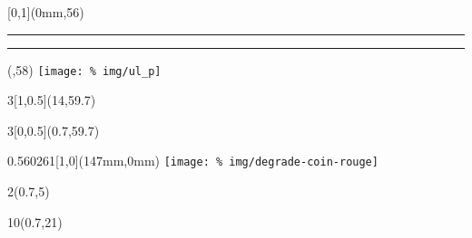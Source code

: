 \begin{frame}[plain]
  \begin{textblock*}{\paperwidth}[0,1](0mm,56\TPVertModule)
    \textcolor{rouge}{\rule{\banderougewidth}{\banderougeheight}}%
    \textcolor{or}{\rule{\bandeorwidth}{\bandeorheight}}           %
  \end{textblock*}

  \begin{textblock*}{\bandeorwidth}(\banderougewidth,58\TPVertModule)
    \texttt{[image: \%
      img/ul\_p]}
  \end{textblock*}
  \begin{textblock*}{3\TPHorizModule}[1,0.5](14\TPHorizModule,59.7\TPVertModule)
    \raggedleft\fsgiid
  \end{textblock*}
  \begin{textblock*}{3\TPHorizModule}[0,0.5](0.7\TPHorizModule,59.7\TPVertModule)
	\iidurl
\end{textblock*}

  \begin{textblock*}{0.560261\imageheight}[1,0](147mm,0mm)
    \texttt{[image: \%
	img/degrade-coin-rouge]}
  \end{textblock*}

  \begin{textblock*}{2\TPHorizModule}(0.7\TPHorizModule,5\TPVertModule)
    \textcolor[rgb]{0.37,0.37,0.37}{\webinaire}
  \end{textblock*}

  \begin{textblock*}{10\TPHorizModule}(0.7\TPHorizModule,21\TPVertModule)
    \textcolor[cmyk]{0.67, 0.66, 0, 0.71}{\titlefmt}
  \end{textblock*}
	\note{}
\end{frame}

\endgroup

